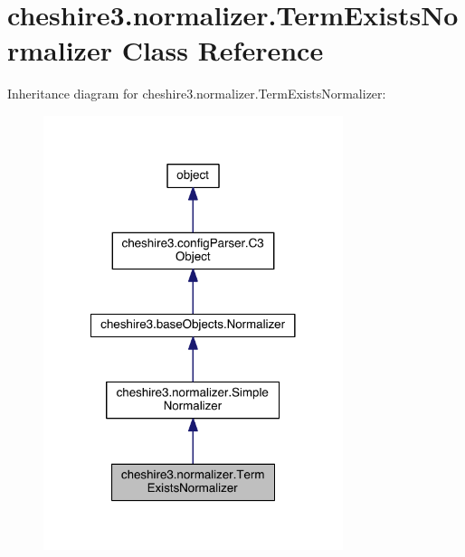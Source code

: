 \hypertarget{classcheshire3_1_1normalizer_1_1_term_exists_normalizer}{\section{cheshire3.\-normalizer.\-Term\-Exists\-Normalizer Class Reference}
\label{classcheshire3_1_1normalizer_1_1_term_exists_normalizer}
}


Inheritance diagram for cheshire3.\-normalizer.\-Term\-Exists\-Normalizer\-:
\nopagebreak
\begin{figure}[H]
\begin{center}
\leavevmode
\includegraphics[width=248pt]{classcheshire3_1_1normalizer_1_1_term_exists_normalizer__inherit__graph}
\end{center}
\end{figure}


